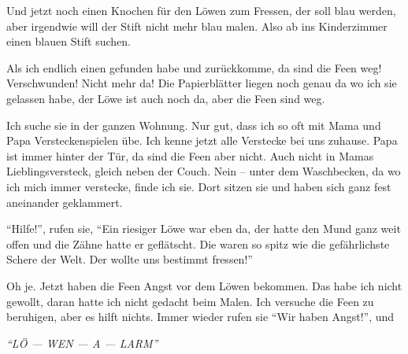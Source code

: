 Und jetzt noch einen Knochen für den Löwen zum Fressen, der soll blau werden, aber irgendwie will der Stift nicht mehr blau malen. Also ab ins Kinderzimmer einen blauen Stift suchen.

Als ich endlich einen gefunden habe und zurückkomme, da sind die Feen weg! Verschwunden! Nicht mehr da! Die Papierblätter liegen noch genau da wo ich sie gelassen habe, der Löwe ist auch noch da, aber die Feen sind weg.

Ich suche sie in der ganzen Wohnung. Nur gut, dass ich so oft mit Mama und Papa Versteckenspielen übe. Ich kenne jetzt alle Verstecke bei uns zuhause. Papa ist immer hinter der Tür, da sind die Feen aber nicht. Auch nicht in Mamas Lieblingsversteck, gleich neben der Couch. Nein -- unter dem Waschbecken, da wo ich mich immer verstecke, finde ich sie. Dort sitzen sie und haben sich ganz fest aneinander geklammert.

\enquote{Hilfe!}, rufen sie, \enquote{Ein riesiger Löwe war eben da, der hatte den Mund ganz weit offen und die Zähne hatte er geflätscht. Die waren so spitz wie die gefährlichste Schere der Welt. Der wollte uns bestimmt fressen!}




Oh je. Jetzt haben die Feen Angst vor dem Löwen bekommen. Das habe ich nicht gewollt, daran hatte ich nicht gedacht beim Malen.  Ich versuche die Feen zu beruhigen, aber es hilft nichts. Immer wieder rufen sie \enquote{Wir haben Angst!}, und
\begin{center}
 {\color{DeepPink}
\large
\itshape
\enquote{LÖ --- WEN --- A --- LARM}}
\end{center}


